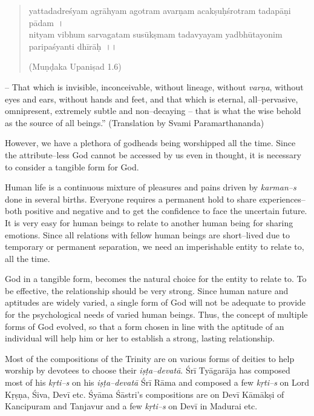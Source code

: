 \begin{verse}
yattadadreśyam agrāhyam agotram avarṇam acakṣuḥśrotram tadapāṇi pādam~।\\ nityam vibhum sarvagatam susūkṣmam tadavyayam yadbhūtayonim paripaśyanti dhīrāḥ~।। 
\begin{flushright}
(Muṇḍaka Upaniṣad 1.6)
\end{flushright}
\end{verse}

\begin{myquote}
– That which is invisible, inconceivable, without lineage, without \textit{varṇa}, without eyes and ears, without hands and feet, and that which is eternal, all–pervasive, omnipresent, extremely subtle and non–decaying – that is what the wise behold as the source of all beings.” (Translation by Svami Paramarthananda)
\end{myquote}

However, we have a plethora of godheads being worshipped all the time. Since the attribute–less God cannot be accessed by us even in thought, it is necessary to consider a tangible form for God.

Human life is a continuous mixture of pleasures and pains driven by \textit{karman–s} done in several births. Everyone requires a permanent hold to share experiences– both positive and negative and to get the confidence to face the uncertain future. It is very easy for human beings to relate to another human being for sharing emotions. Since all relations with fellow human beings are short–lived due to temporary or permanent separation, we need an imperishable entity to relate to, all the time.

God in a tangible form, becomes the natural choice for the entity to relate to. To be effective, the relationship should be very strong. Since human nature and aptitudes are widely varied, a single form of God will not be adequate to provide for the psychological needs of varied human beings. Thus, the concept of multiple forms of God evolved, so that a form chosen in line with the aptitude of an individual will help him or her to establish a strong, lasting relationship.

Most of the compositions of the Trinity are on various forms of deities to help worship by devotees to choose their \textit{iṣṭa–devatā}. Śrī Tyāgarāja has composed most of his \textit{kṛti–s} on his \textit{iṣṭa–devatā} Śrī Rāma and composed a few \textit{kṛti–s} on Lord Kṛṣṇa, Śiva, Devī etc. Śyāma Śāstri’s compositions are on Devī Kāmākṣi of Kancipuram and Tanjavur and a few \textit{kṛti–s} on Devī in Madurai etc.

